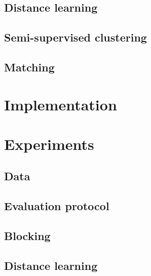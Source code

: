 \documentclass{article}
\begin{document}
\subsection{Distance learning}

\subsection{Semi-supervised clustering}

\subsection{Matching}



\section{Implementation}
\label{implementation}



\section{Experiments}
\label{experiments}

\subsection{Data}

\subsection{Evaluation protocol}

\subsection{Blocking}

\subsection{Distance learning}
\end{document}
